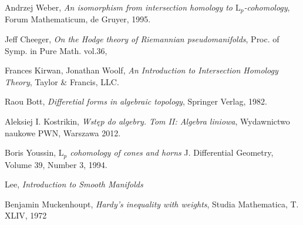 \documentclass[licencjacka]{pracamgr}
\theoremstyle{definition}
\theoremstyle{definition}
\theoremstyle{plain}
\theoremstyle{plain}
\theoremstyle{plain}
\theoremstyle{plain}
\begin{document}




\begin{thebibliography}{99}

 Andrzej Weber, \textit{An isomorphism from
  intersection homology to $\mathrm{L}_p$-cohomology}, Forum
  Mathematicum, de Gruyer, 1995.
  
 Jeff Cheeger, \textit{On the Hodge theory
  of Riemannian pseudomanifolds}, Proc. of Symp. in Pure Math. vol.36,

 Frances Kirwan, Jonathan Woolf, \textit{An Introduction
to Intersection Homology Theory}, Taylor \& Francis, LLC.

 Raou Bott, \textit{Differetial forms in algebraic
  topology}, Springer Verlag, 1982.

 Aleksiej I. Kostrikin, \textit{Wstęp do algebry.
Tom II: Algebra liniowa}, Wydawnictwo naukowe PWN, Warszawa 2012.

 Boris Youssin, \textit{$\mathrm{L}_p$
  cohomology of cones and horns } J. Differential Geometry, Volume 39,
  Number 3, 1994.
  
 Lee, \textit{Introduction to Smooth Manifolds}

 Benjamin Muckenhoupt, \textit{Hardy's inequality
with weights}, Studia Mathematica, T. XLIV, 1972

\end{thebibliography}
\end{document}
